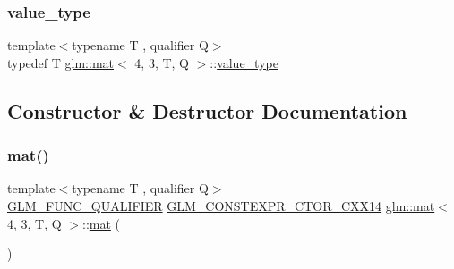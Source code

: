 \mbox{\label{structglm_1_1mat_3_014_00_013_00_01_t_00_01_q_01_4_ad5a9ca85d27eb13ba59ee335bdb6783f}} 
\subsubsection{\texorpdfstring{value\+\_\+type}{value\_type}}
{\footnotesize\ttfamily template$<$typename T , qualifier Q$>$ \\
typedef T \mbox{\hyperlink{structglm_1_1mat}{glm\+::mat}}$<$ 4, 3, T, Q $>$\+::\mbox{\hyperlink{structglm_1_1mat_3_014_00_013_00_01_t_00_01_q_01_4_ad5a9ca85d27eb13ba59ee335bdb6783f}{value\+\_\+type}}}



\subsection{Constructor \& Destructor Documentation}
\mbox{\label{structglm_1_1mat_3_014_00_013_00_01_t_00_01_q_01_4_a29e047d87eb90b8703e6955d135451b6}} 
\subsubsection{\texorpdfstring{mat()}{mat()}\hspace{0.1cm}{\footnotesize\ttfamily [1/21]}}
{\footnotesize\ttfamily template$<$typename T , qualifier Q$>$ \\
\mbox{\hyperlink{setup_8hpp_a33fdea6f91c5f834105f7415e2a64407}{G\+L\+M\+\_\+\+F\+U\+N\+C\+\_\+\+Q\+U\+A\+L\+I\+F\+I\+ER}} \mbox{\hyperlink{setup_8hpp_a0900f9145e68bf6061b6f5e7be3fa751}{G\+L\+M\+\_\+\+C\+O\+N\+S\+T\+E\+X\+P\+R\+\_\+\+C\+T\+O\+R\+\_\+\+C\+X\+X14}} \mbox{\hyperlink{structglm_1_1mat}{glm\+::mat}}$<$ 4, 3, T, Q $>$\+::\mbox{\hyperlink{structglm_1_1mat}{mat}} (\begin{DoxyParamCaption}{ }\end{DoxyParamCaption})}

\mbox{\label{structglm_1_1mat_3_014_00_013_00_01_t_00_01_q_01_4_a59686658a0451cff1cda8c000e6b3579}} 
